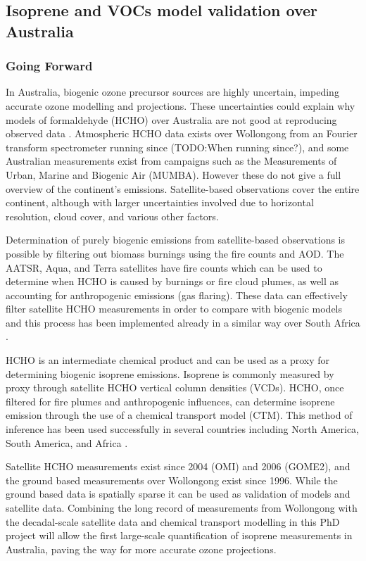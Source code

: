 \subsection{Isoprene and VOCs model validation over Australia}
\subsubsection{Going Forward}
In Australia, biogenic ozone precursor sources are highly uncertain, impeding accurate ozone modelling and projections. These uncertainties could explain why models of formaldehyde (HCHO) over Australia are not good at reproducing observed data \cite{Stavrakou_2009}. Atmospheric HCHO data exists over Wollongong from an Fourier transform spectrometer running since (TODO:When running since?), and some Australian measurements exist from campaigns such as the Measurements of Urban, Marine and Biogenic Air (MUMBA).
However these do not give a full overview of the continent's emissions. Satellite-based observations cover the entire continent, although with larger uncertainties involved due to horizontal resolution, cloud cover, and various other factors. 

Determination of purely biogenic emissions from satellite-based observations is possible by filtering out biomass burnings using the fire counts and AOD.
The AATSR, Aqua, and Terra satellites have fire counts which can be used to determine when HCHO is caused by burnings or fire cloud plumes, as well as accounting for anthropogenic emissions (gas flaring).
These data can effectively filter satellite HCHO measurements in order to compare with biogenic models and this process has been implemented already in a similar way over South Africa \cite{Marais_2012}.

HCHO is an intermediate chemical product and can be used as a proxy for determining biogenic isoprene emissions. 
Isoprene is commonly measured by proxy through satellite HCHO vertical column densities (VCDs). HCHO, once filtered for fire plumes and anthropogenic influences, can determine isoprene emission through the use of a chemical transport model (CTM).
This method of inference has been used successfully in several countries including North America\cite{Palmer_2003}, South America\cite{Barkley_2013}, and Africa \cite{Marais_2012}.

Satellite HCHO measurements exist since 2004 (OMI) and 2006 (GOME2), and the ground based measurements over Wollongong exist since 1996. While the ground based data is spatially sparse it can be used as validation of models and satellite data. Combining the long record of measurements from Wollongong with the decadal-scale satellite data and chemical transport modelling in this PhD project will allow the first large-scale quantification of isoprene measurements in Australia, paving the way for more accurate ozone projections.

  